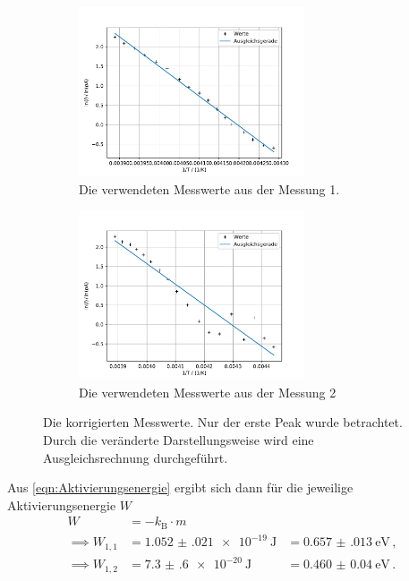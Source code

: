   \begin{figure}[H]
    \begin{subfigure}[b]{.5\linewidth}
      \centering
      \includegraphics[height=5cm, keepaspectratio]{build/log(I)_1durchT_1.pdf}
      \caption{Die verwendeten Messwerte aus der Messung 1.}
      \label{fig:log_I_1_durch_T_Messung_1}
    \end{subfigure}
    \begin{subfigure}[b]{.5\linewidth}
      \centering
      \includegraphics[height=5cm, keepaspectratio]{build/log(I)_1durchT_2.pdf}
      \caption{Die verwendeten Messwerte aus der Messung 2}
      \label{fig:log_I_1_durch_T_Messung 2}
    \end{subfigure}
    \caption{Die korrigierten Messwerte. Nur der erste Peak wurde betrachtet. Durch die veränderte Darstellungsweise wird eine Ausgleichsrechnung durchgeführt.}
  \end{figure} %

  \noindent
  Aus \eqref{eqn:Aktivierungsenergie} ergibt sich dann für die jeweilige Aktivierungsenergie $W$
  \begin{align*}
    W   &= -k_\text{B} \cdot m \\
    \implies W_{1,1} &= \SI{1.052(021)e-19}{\joule} &= \SI{0.657(013)}{\electronvolt} \, , \\
    \implies W_{1,2} &= \SI{7.3(6)e-20}{\joule} &= \SI{0.460(40)}{\electronvolt}  \, .\\
  \end{align*}

